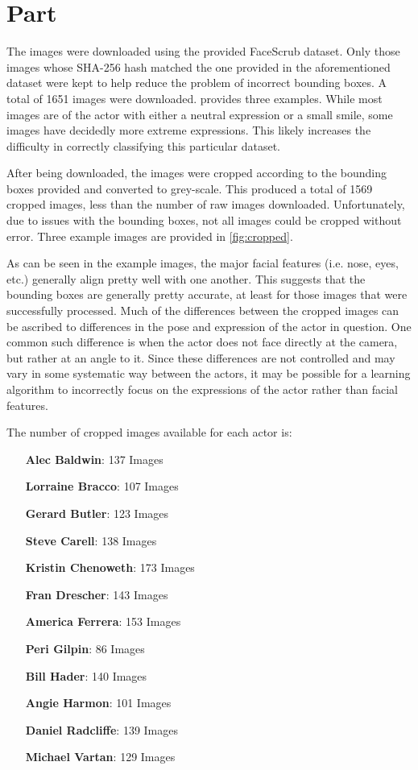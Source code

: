 \documentclass{article}
\newcommand{\enterproblemHeader}[1]{
}
\newcommand{\exitproblemHeader}[1]{
}
\newcounter{problem} %
\newcommand{\problemName}{}
\newenvironment{problem}[1][Part \theproblem]{ %
	\stepcounter{problem} %
	\renewcommand{\problemName}{#1} %
	\section{\problemName} %
	\enterproblemHeader{\problemName} %
}{
	\exitproblemHeader{\problemName} %
}
\begin{document}
\FloatBarrier
\begin{problem}
	The images were downloaded using the provided FaceScrub dataset. Only those images whose SHA-256 hash matched the one provided in the aforementioned dataset were kept to help reduce the problem of incorrect bounding boxes. A total of \num{1651} images were downloaded.  provides three examples. While most images are of the actor with either a neutral expression or a small smile, some images have decidedly more extreme expressions. This likely increases the difficulty in correctly classifying this particular dataset.
	
	After being downloaded, the images were cropped according to the bounding boxes provided and converted to grey-scale. This produced a total of \num{1569} cropped images, less than the number of raw images downloaded. Unfortunately, due to issues with the bounding boxes, not all images could be cropped without error. Three example images are provided in \cref{fig:cropped}.
	
	As can be seen in the example images, the major facial features (i.e. nose, eyes, etc.) generally align pretty well with one another. This suggests that the bounding boxes are generally pretty accurate, at least for those images that were successfully processed. Much of the differences between the cropped images can be ascribed to differences in the pose and expression of the actor in question. One common such difference is when the actor does not face directly at the camera, but rather at an angle to it. Since these differences are not controlled and may vary in some systematic way between the actors, it may be possible for a learning algorithm to incorrectly focus on the expressions of the actor rather than facial features.
	
	The number of cropped images available for each actor is:
	\begin{itemize}[leftmargin=150pt]
		\item[\textbf{Alec Baldwin}:] 137 Images
		\item[\textbf{Lorraine Bracco}:] 107 Images
		\item[\textbf{Gerard Butler}:] 123 Images
		\item[\textbf{Steve Carell}:] 138 Images
		\item[\textbf{Kristin Chenoweth}:] 173 Images
		\item[\textbf{Fran Drescher}:] 143 Images
		\item[\textbf{America Ferrera}:] 153 Images
		\item[\textbf{Peri Gilpin}:] 86 Images
		\item[\textbf{Bill Hader}:] 140 Images
		\item[\textbf{Angie Harmon}:] 101 Images
		\item[\textbf{Daniel Radcliffe}:] 139 Images
		\item[\textbf{Michael Vartan}:] 129 Images
	\end{itemize}
	

\end{problem}
\end{document}
